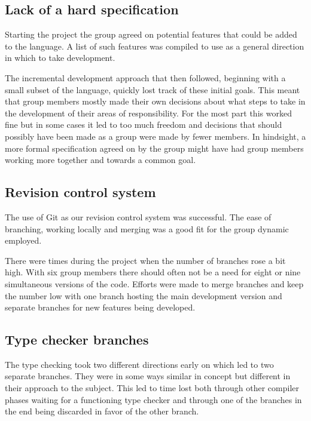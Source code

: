 \subsection{Lack of a hard specification}

Starting the project the group agreed on potential features that could be added to the language. A list of such features was compiled to use as a general direction in which to take development. 

The incremental development approach that then followed, beginning with a small subset of the language, quickly lost track of these initial goals. This meant that group members mostly made their own decisions about what steps to take in the development of their areas of responsibility. For the most part this worked fine but in some cases it led to too much freedom and decisions that should possibly have been made as a group were made by fewer members. In hindsight, a more formal specification agreed on by the group might have had group members working more together and towards a common goal.

\subsection{Revision control system}

The use of Git as our revision control system was successful. The ease of branching, working locally and merging was a good fit for the group dynamic employed. 

There were times during the project when the number of branches rose a bit high. With six group members there should often not be a need for eight or nine simultaneous versions of the code. Efforts were made to merge branches and keep the number low with one branch hosting the main development version and separate branches for new features being developed.

\subsection{Type checker branches}

The type checking took two different directions early on which led to two separate branches. They were in some ways similar in concept but different in their approach to the subject. This led to time lost both through other compiler phases waiting for a functioning type checker and through one of the branches in the end being discarded in favor of the other branch. 

